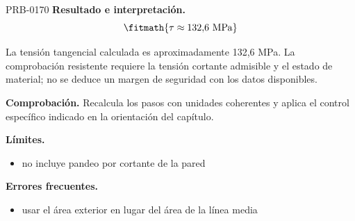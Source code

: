 \begin{studiumworked}{PRB-0170}
\textbf{Resultado e interpretación.}\[\fitmath{\tau \approx 132{,}6\ \mathrm{MPa}}\]

La tensión tangencial calculada es aproximadamente 132,6 MPa. La comprobación resistente requiere la tensión cortante admisible y el estado de material; no se deduce un margen de seguridad con los datos disponibles.

\par\textbf{Comprobación.} Recalcula los pasos con unidades coherentes y aplica el control específico indicado en la orientación del capítulo.

\textbf{Límites.}\begin{itemize}\item no incluye pandeo por cortante de la pared\end{itemize}

\textbf{Errores frecuentes.}\begin{itemize}\item usar el área exterior en lugar del área de la línea media\end{itemize}

\end{studiumworked}

\Needspace{.3\textheight}

